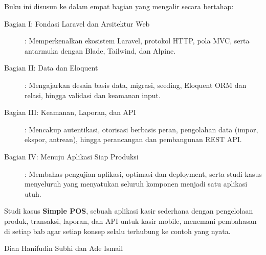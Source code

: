 Buku ini disusun ke dalam empat bagian yang mengalir secara bertahap:

\begin{description}
    \item[Bagian I: Fondasi Laravel dan Arsitektur Web]: Memperkenalkan
          ekosistem Laravel, protokol HTTP, pola MVC, serta antarmuka dengan
          Blade, Tailwind, dan Alpine.
    \item[Bagian II: Data dan Eloquent]: Mengajarkan desain basis data,
          migrasi, seeding, Eloquent ORM dan relasi, hingga validasi dan
          keamanan input.
    \item[Bagian III: Keamanan, Laporan, dan API]: Mencakup autentikasi,
          otorisasi berbasis peran, pengolahan data (impor, ekspor, antrean),
          hingga perancangan dan pembangunan REST API.
    \item[Bagian IV: Menuju Aplikasi Siap Produksi]: Membahas pengujian
          aplikasi, optimasi dan deployment, serta studi kasus menyeluruh
          yang menyatukan seluruh komponen menjadi satu aplikasi utuh.
\end{description}

Studi kasus \textbf{Simple POS}, sebuah aplikasi kasir sederhana dengan
pengelolaan produk, transaksi, laporan, dan API untuk kasir mobile, menemani
pembahasan di setiap bab agar setiap konsep selalu terhubung ke contoh yang
nyata.

\vspace{1cm}

\noindent
Dian Hanifudin Subhi dan Ade Ismail

\cleardoublepage
